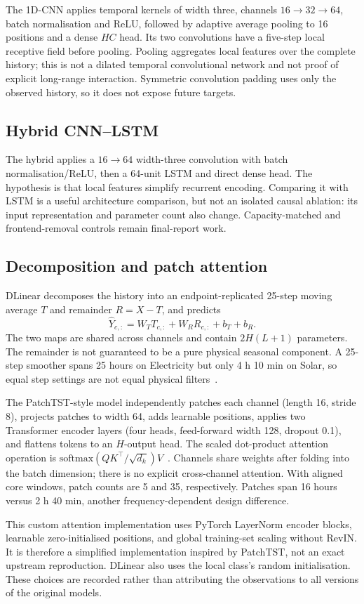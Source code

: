 \documentclass[10pt,a4paper]{article}
\begin{document}
The 1D-CNN applies temporal kernels of width three, channels $16\to32\to64$, batch normalisation and ReLU, followed by adaptive average pooling to 16 positions and a dense $HC$ head. Its two convolutions have a five-step local receptive field before pooling. Pooling aggregates local features over the complete history; this is not a dilated temporal convolutional network and not proof of explicit long-range interaction. Symmetric convolution padding uses only the observed history, so it does not expose future targets.
\subsection{Hybrid CNN--LSTM}
The hybrid applies a $16\to64$ width-three convolution with batch normalisation/ReLU, then a 64-unit LSTM and direct dense head. The hypothesis is that local features simplify recurrent encoding. Comparing it with LSTM is a useful architecture comparison, but not an isolated causal ablation: its input representation and parameter count also change. Capacity-matched and frontend-removal controls remain final-report work.
\subsection{Decomposition and patch attention}
DLinear decomposes the history into an endpoint-replicated 25-step moving average $T$ and remainder $R=X-T$, and predicts
\[\hat Y_{c,:}=W_TT_{c,:}+W_RR_{c,:}+b_T+b_R.\]
The two maps are shared across channels and contain $2H(L+1)$ parameters. The remainder is not guaranteed to be a pure physical seasonal component. A 25-step smoother spans 25 hours on Electricity but only 4 h 10 min on Solar, so equal step settings are not equal physical filters~\cite{dlinear}.

The PatchTST-style model independently patches each channel (length 16, stride 8), projects patches to width 64, adds learnable positions, applies two Transformer encoder layers (four heads, feed-forward width 128, dropout 0.1), and flattens tokens to an $H$-output head. The scaled dot-product attention operation is $\mathrm{softmax}(QK^\top/\sqrt{d_k})V$~\cite{patch}. Channels share weights after folding into the batch dimension; there is no explicit cross-channel attention. With aligned core windows, patch counts are 5 and 35, respectively. Patches span 16 hours versus 2 h 40 min, another frequency-dependent design difference.

This custom attention implementation uses PyTorch LayerNorm encoder blocks, learnable zero-initialised positions, and global training-set scaling without RevIN. It is therefore a simplified implementation inspired by PatchTST, not an exact upstream reproduction. DLinear also uses the local class's random initialisation. These choices are recorded rather than attributing the observations to all versions of the original models.
\end{document}
